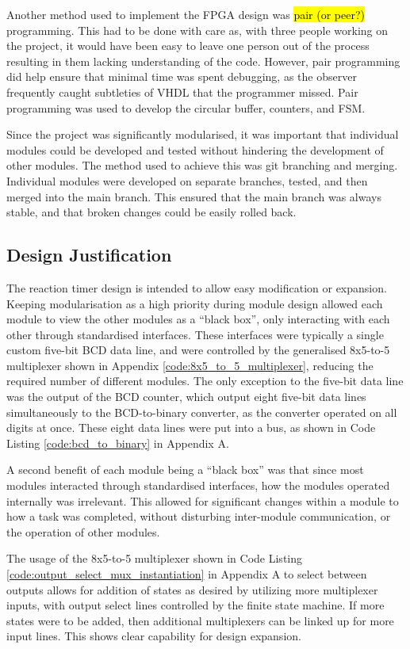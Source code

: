 \documentclass[11pt]{article}
\begin{document}
Another method used to implement the FPGA design was \hl{pair (or peer?)} programming. This had to be done with care as, with three people working on the project, it would have been easy to leave one person out of the process resulting in them lacking understanding of the code. However, pair programming did help ensure that minimal time was spent debugging, as the observer frequently caught subtleties of VHDL that the programmer missed. Pair programming was used to develop the circular buffer, counters, and FSM.

Since the project was significantly modularised, it was important that individual modules could be developed and tested without hindering the development of other modules. The method used to achieve this was git branching and merging. Individual modules were developed on separate branches, tested, and then merged into the main branch. This ensured that the main branch was always stable, and that broken changes could be easily rolled back.

\subsection{Design Justification}

The reaction timer design is intended to allow easy modification or expansion. Keeping modularisation as a high priority during module design allowed each module to view the other modules as a ``black box'', only interacting with each other through standardised interfaces. These interfaces were typically a single custom five-bit BCD data line, and were controlled by the generalised 8x5-to-5 multiplexer shown in Appendix \ref{code:8x5_to_5_multiplexer}, reducing the required number of different modules. The only exception to the five-bit data line was the output of the BCD counter, which output eight five-bit data lines simultaneously to the BCD-to-binary converter, as the converter operated on all digits at once. These eight data lines were put into a bus, as shown in Code Listing \ref{code:bcd_to_binary} in Appendix A.

A second benefit of each module being a ``black box'' was that since most modules interacted through standardised interfaces, how the modules operated internally was irrelevant. This allowed for significant changes within a module to how a task was completed, without disturbing inter-module communication, or the operation of other modules.

The usage of the 8x5-to-5 multiplexer shown in Code Listing \ref{code:output_select_mux_instantiation} in Appendix A to select between outputs allows for addition of states as desired by utilizing more multiplexer inputs, with output select lines controlled by the finite state machine. If more states were to be added, then additional multiplexers can be linked up for more input lines. This shows clear capability for design expansion.
\end{document}
